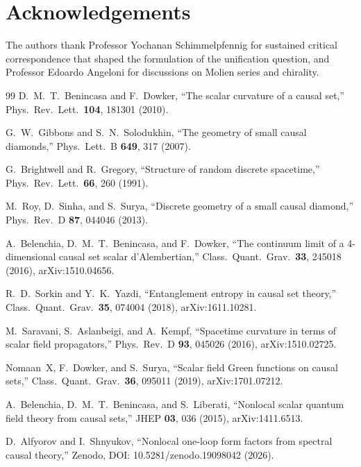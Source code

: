\documentclass[12pt,a4paper]{article}
\begin{document}
\section*{Acknowledgements}

The authors thank Professor Yochanan Schimmelpfennig for sustained critical correspondence that shaped the formulation of the unification question, and Professor Edoardo Angeloni for discussions on Molien series and chirality.

\begin{thebibliography}{99}
 D.~M.~T.~Benincasa and F.~Dowker,
  ``The scalar curvature of a causal set,''
  Phys.\ Rev.\ Lett.\ \textbf{104}, 181301 (2010).

 G.~W.~Gibbons and S.~N.~Solodukhin,
  ``The geometry of small causal diamonds,''
  Phys.\ Lett.\ B \textbf{649}, 317 (2007).

 G.~Brightwell and R.~Gregory,
  ``Structure of random discrete spacetime,''
  Phys.\ Rev.\ Lett.\ \textbf{66}, 260 (1991).

 M.~Roy, D.~Sinha, and S.~Surya,
  ``Discrete geometry of a small causal diamond,''
  Phys.\ Rev.\ D \textbf{87}, 044046 (2013).

 A.~Belenchia, D.~M.~T.~Benincasa, and F.~Dowker,
  ``The continuum limit of a 4-dimensional causal set scalar d'Alembertian,''
  Class.\ Quant.\ Grav.\ \textbf{33}, 245018 (2016), arXiv:1510.04656.

 R.~D.~Sorkin and Y.~K.~Yazdi,
  ``Entanglement entropy in causal set theory,''
  Class.\ Quant.\ Grav.\ \textbf{35}, 074004 (2018), arXiv:1611.10281.

 M.~Saravani, S.~Aslanbeigi, and A.~Kempf,
  ``Spacetime curvature in terms of scalar field propagators,''
  Phys.\ Rev.\ D \textbf{93}, 045026 (2016), arXiv:1510.02725.

 Nomaan~X, F.~Dowker, and S.~Surya,
  ``Scalar field Green functions on causal sets,''
  Class.\ Quant.\ Grav.\ \textbf{36}, 095011 (2019), arXiv:1701.07212.

 A.~Belenchia, D.~M.~T.~Benincasa, and S.~Liberati,
  ``Nonlocal scalar quantum field theory from causal sets,''
  JHEP \textbf{03}, 036 (2015), arXiv:1411.6513.

 D.~Alfyorov and I.~Shnyukov,
  ``Nonlocal one-loop form factors from spectral causal theory,''
  Zenodo, DOI: 10.5281/zenodo.19098042 (2026).
\end{thebibliography}
\end{document}
